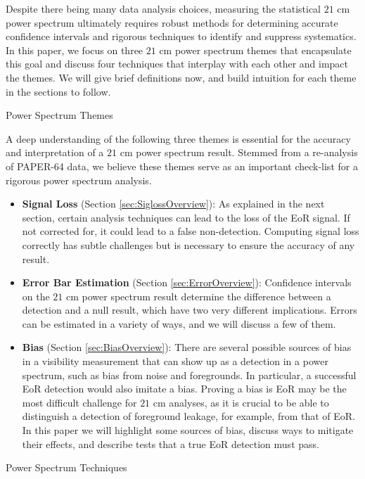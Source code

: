 \documentclass[preprint2,numberedappendix,tighten]{aastex6}  %
\begin{document}
Despite there being many data analysis choices, measuring the statistical $21$ cm power spectrum ultimately requires robust methods for determining accurate confidence intervals and rigorous techniques to identify and suppress systematics.  In this paper, we focus on three $21$ cm power spectrum themes that encapsulate this goal and discuss four techniques that interplay with each other and impact the themes. We will give brief definitions now, and build intuition for each theme in the sections to follow.

\begin{center}
Power Spectrum Themes
\end{center}

A deep understanding of the following three themes is essential for the accuracy and interpretation of a $21$ cm power spectrum result. Stemmed from a re-analysis of PAPER-64 data, we believe these themes serve as an important check-list for a rigorous power spectrum analysis.
\begin{itemize}
\item \textbf{Signal Loss} (Section \ref{sec:SiglossOverview}): As explained in the next section, certain analysis techniques can lead to the loss of the EoR signal. If not corrected for, it could lead to a false non-detection. Computing signal loss correctly has subtle challenges but is necessary to ensure the accuracy of any result.
\item \textbf{Error Bar Estimation} (Section \ref{sec:ErrorOverview}): Confidence intervals on the $21$ cm power spectrum result determine the difference between a detection and a null result, which have two very different implications. Errors can be estimated in a variety of ways, and we will discuss a few of them.
\item \textbf{Bias} (Section \ref{sec:BiasOverview}): There are several possible sources of bias in a visibility measurement that can show up as a detection in a power spectrum, such as bias from noise and foregrounds. In particular, a successful EoR detection would also imitate a bias. Proving a bias is EoR may be the most difficult challenge for $21$ cm analyses, as it is crucial to be able to distinguish a detection of foreground leakage, for example, from that of EoR. In this paper we will highlight some sources of bias, discuss ways to mitigate their effects, and describe tests that a true EoR detection must pass.
\end{itemize}

\begin{center}
Power Spectrum Techniques
\end{center}
\end{document}
